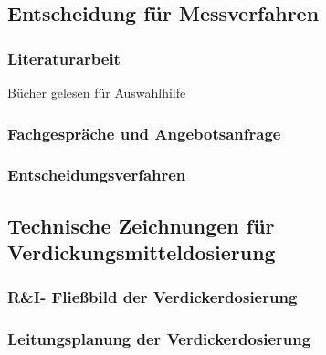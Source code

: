 \subsection{Entscheidung für Messverfahren}
\subsubsection{Literaturarbeit}
Bücher gelesen für Auswahlhilfe
\subsubsection{Fachgespräche und Angebotsanfrage}
\subsubsection{Entscheidungsverfahren}

\subsection{Technische Zeichnungen für Verdickungsmitteldosierung}
\subsubsection{R\&I- Fließbild der Verdickerdosierung}
\subsubsection{Leitungsplanung der Verdickerdosierung}


